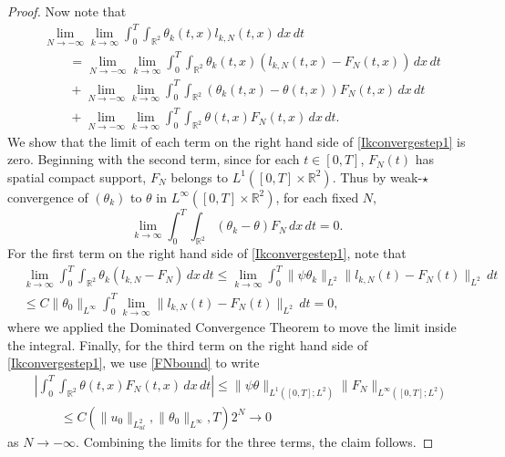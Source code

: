 \documentclass[11pt,reqno,xcolor=svgnames]{amsart}
\def\R{{\mathbb R}}
\theoremstyle{plain}
\theoremstyle{definition}
\theoremstyle{plain}
\theoremstyle{remark}
\newcommand{\abs}[1]{\left\vert#1\right\vert}
\begin{document}
\begin{proof}
Now note that
\begin{equation}\label{Ikconvergestep1}
\begin{split}
& \lim_{N\rightarrow -\infty}\lim_{k\rightarrow\infty}\int_0^T\int_{\R^2} \theta_k(t,x)l_{k,N}(t,x) \, dx \, dt \\
&\qquad = \lim_{N\rightarrow -\infty}\lim_{k\rightarrow\infty} \int_0^T\int_{\R^2} \theta_k(t,x) (l_{k,N}(t,x)- F_N(t,x)) \, dx \, dt \\
&\qquad + \lim_{N\rightarrow -\infty}\lim_{k\rightarrow\infty} \int_0^T\int_{\R^2} (\theta_k(t,x) - \theta(t,x))F_N(t,x) \, dx \, dt \\
&\qquad + \lim_{N\rightarrow -\infty}\lim_{k\rightarrow\infty} \int_0^T\int_{\R^2} \theta(t,x)F_N(t,x) \, dx \, dt.  
\end{split}
\end{equation}
We show that the limit of each term on the right hand side of \cref{Ikconvergestep1} is zero.  Beginning with the second term, since for each $t\in [0,T]$, $F_N(t)$ has spatial compact support, $F_N$ belongs to $L^1([0,T]\times \R^2)$.  Thus by weak-$\star$ convergence of $(\theta_k)$ to $\theta$ in $L^{\infty}([0,T]\times \R^2)$, for each fixed $N$,
$$ \lim_{k\rightarrow\infty} \int_0^T\int_{\R^2} (\theta_k - \theta)F_N \, dx \, dt = 0.$$
For the first term on the right hand side of \cref{Ikconvergestep1}, note that
\begin{equation*}
\begin{split}
&\lim_{k\rightarrow\infty} \int_0^T\int_{\R^2} \theta_k (l_{k,N}- F_N) \, dx \, dt \leq \lim_{k\rightarrow\infty} \int_0^T \|\psi \theta_k\|_{L^2} \|l_{k,N}(t)- F_N(t)\|_{L^2}  \, dt\\
&\leq C\| \theta_0 \|_{L^{\infty}} \int_0^T \lim_{k\rightarrow\infty} \|l_{k,N}(t)- F_N(t)\|_{L^2}  \, dt = 0,
\end{split}
\end{equation*}
where we applied the Dominated Convergence Theorem to move the limit inside the integral.  Finally, for the third term on the right hand side of \cref{Ikconvergestep1}, we use \cref{FNbound} to write
\begin{equation*}
\begin{split}
&\abs{\int_0^T\int_{\R^2} \theta(t,x)F_N(t,x) \, dx \, dt} \leq  \| \psi\theta \|_{L^1([0,T];L^2)} \|F_N \|_{L^{\infty}([0,T]; L^2)} \\
&\qquad \leq   C(\|u_0\|_{L^2_{ul}}, \|\theta_0\|_{L^{\infty}}, T)2^N \rightarrow 0 
\end{split}
\end{equation*}
as $N\rightarrow -\infty$.  Combining the limits for the three terms, the claim follows.
\end{proof}
\end{document}
